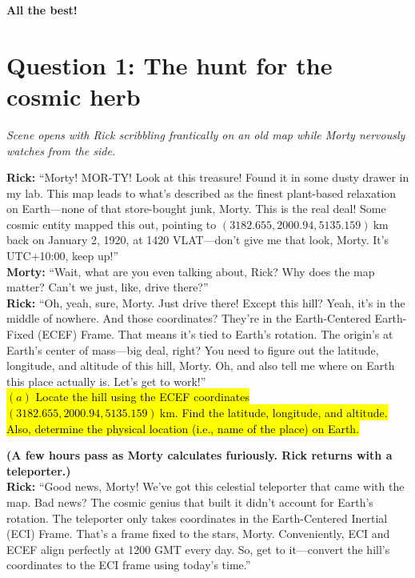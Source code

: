 \documentclass[a4paper, 12pt]{exam}
\begin{document}
	\begin{center}
		\textbf{All the best!}
	\end{center}
		
	\pagebreak
	


\section*{Question 1: The hunt for the cosmic herb}

\noindent \textit{Scene opens with Rick scribbling frantically on an old map while Morty nervously watches from the side.}

\bigskip
\noindent \textbf{Rick:} “Morty! MOR-TY! Look at this treasure! Found it in some dusty drawer in my lab. This map leads to what’s described as the finest plant-based relaxation on Earth—none of that store-bought junk, Morty. This is the real deal! Some cosmic entity mapped this out, pointing to $(3182.655, 2000.94, 5135.159) \ \mathrm{km}$ back on January 2, 1920, at 1420 VLAT—don’t give me that look, Morty. It’s UTC+10:00, keep up!” \\

\noindent \textbf{Morty:} “Wait, what are you even talking about, Rick? Why does the map matter? Can’t we just, like, drive there?” \\

\noindent \textbf{Rick:} “Oh, yeah, sure, Morty. Just drive there! Except this hill? Yeah, it’s in the middle of nowhere. And those coordinates? They’re in the Earth-Centered Earth-Fixed (ECEF) Frame. That means it’s tied to Earth’s rotation. The origin’s at Earth’s center of mass—big deal, right? You need to figure out the latitude, longitude, and altitude of this hill, Morty. Oh, and also tell me where on Earth this place actually is. Let’s get to work!” \\

\hl{$(a)$ Locate the hill using the ECEF coordinates $(3182.655, 2000.94, 5135.159) \ \mathrm{km}$. Find the latitude, longitude, and altitude. Also, determine the physical location (i.e., name of the place) on Earth.}

\bigskip
\noindent \textbf{(A few hours pass as Morty calculates furiously. Rick returns with a teleporter.)} \\

\noindent \textbf{Rick:} “Good news, Morty! We’ve got this celestial teleporter that came with the map. Bad news? The cosmic genius that built it didn’t account for Earth’s rotation. The teleporter only takes coordinates in the Earth-Centered Inertial (ECI) Frame. That’s a frame fixed to the stars, Morty. Conveniently, ECI and ECEF align perfectly at 1200 GMT every day. So, get to it—convert the hill’s coordinates to the ECI frame using today’s time.” \\
\end{document}
